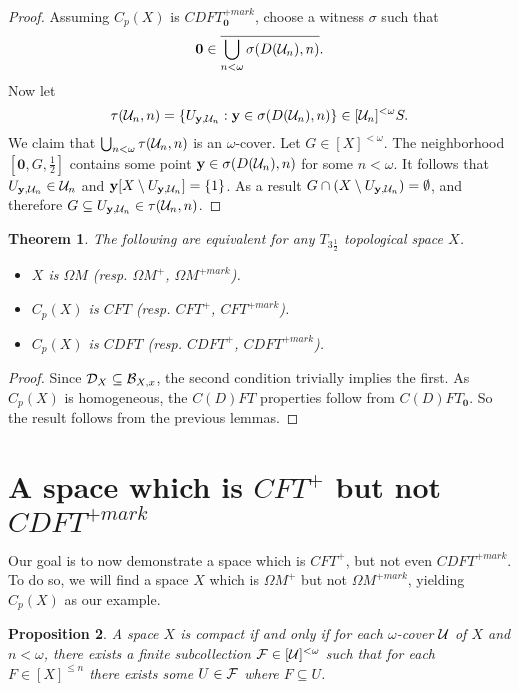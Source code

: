 \documentclass{amsart}
\renewcommand{\vec}{\mathbf}
\theoremstyle{plain}
\newtheorem{theorem}{Theorem}
\newtheorem{proposition}[theorem]{Proposition}
\theoremstyle{definition}
\theoremstyle{remark}
\theoremstyle{plain}
\theoremstyle{definition}
\theoremstyle{remark}
\begin{document}
\begin{proof}
  Assuming \(C_p(X)\) is \(CDFT_{\vec 0}^{+mark}\), choose a witness
  \(\sigma\) such that
  \[
    \vec 0
      \in
    \cl{\bigcup_{n<\omega} \sigma(D(\mc U_n),n)}
  .\]
  Now let
  \[
    \tau(\mc U_n,n)
      =
    \{
      U_{\vec y,\mc U_n}
    :
      \vec y \in \sigma(D(\mc U_n),n)
    \}
      \in
    [\mc U_n]^{<\omega}S
  .\]
  We claim that \(\bigcup_{n<\omega}\tau(\mathcal{U}_n,n)\)
  is an \(\omega\)-cover.
  Let \(G\in[X]^{<\omega}\). The neighborhood \([\vec 0,G,\frac{1}{2}]\)
  contains some point \(\vec y\in \sigma(D(\mc U_n),n)\)
  for some \(n<\omega\). It follows
  that \(U_{\vec y,\mc U_n}\in\mc U_n\) and
  \(\vec y[X\setminus U_{\vec y,\mc U_n}]=\{1\}\). As a result
  \(G\cap(X\setminus U_{\vec y,\mc U_n})=\emptyset\), and therefore
  \(G\subseteq U_{\vec y,\mc U_n}\in\mc \tau(\mc U_n,n)\).
\end{proof}

\begin{theorem}
  The following are equivalent for any \(T_{3\frac{1}{2}}\)
  topological space \(X\).
    \begin{itemize}
      \item \(X\) is \(\Omega M\)
            (resp. \(\Omega M^+\), \(\Omega M^{+mark}\)).
      \item \(C_p(X)\) is \(CFT\)
            (resp. \(CFT^+\), \(CFT^{+mark}\)).
      \item \(C_p(X)\) is \(CDFT\)
            (resp. \(CDFT^+\), \(CDFT^{+mark}\)).
    \end{itemize}
\end{theorem}

\begin{proof}
  Since \(\mathcal{D}_X\subseteq \mathcal{B}_{X,x}\), the second condition trivially
  implies the first. As \(C_p(X)\) is homogeneous, the \(C(D)FT\) properties
  follow from \(C(D)FT_{\vec 0}\). So the result follows from the
  previous lemmas.
\end{proof}

\section{A space which is \(CFT^+\) but not \(CDFT^{+mark}\)}

Our goal is to now demonstrate a space which is \(CFT^+\),
but not even \(CDFT^{+mark}\). To do so, we will find a space \(X\)
which is \(\Omega M^+\) but not \(\Omega M^{+mark}\), yielding \(C_p(X)\)
as our example.

\begin{proposition}\label{altCompactCharacterization}
  A space \(X\) is compact if and only if for each \(\omega\)-cover
  \(\mathcal{U}\) of \(X\) and \(n<\omega\), there exists a finite subcollection
  \(\mathcal{F}\in[\mathcal{U}]^{<\omega}\) such that for each \(F\in[X]^{\leq n}\)
  there exists some \(U\in\mathcal{F}\) where \(F\subseteq U\).
\end{proposition}
\end{document}

